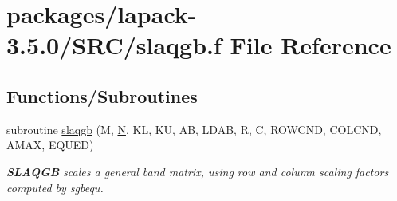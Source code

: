 \hypertarget{slaqgb_8f}{}\section{packages/lapack-\/3.5.0/\+S\+R\+C/slaqgb.f File Reference}
\label{slaqgb_8f}
\subsection*{Functions/\+Subroutines}
\begin{DoxyCompactItemize}
\item 
subroutine \hyperlink{group__realGBauxiliary_ga4041f9392fd5e5137bcbb2ed29ae3b14}{slaqgb} (M, \hyperlink{polmisc_8c_a0240ac851181b84ac374872dc5434ee4}{N}, K\+L, K\+U, A\+B, L\+D\+A\+B, R, C, R\+O\+W\+C\+N\+D, C\+O\+L\+C\+N\+D, A\+M\+A\+X, E\+Q\+U\+E\+D)
\begin{DoxyCompactList}\small\item\em {\bfseries S\+L\+A\+Q\+G\+B} scales a general band matrix, using row and column scaling factors computed by sgbequ. \end{DoxyCompactList}\end{DoxyCompactItemize}
